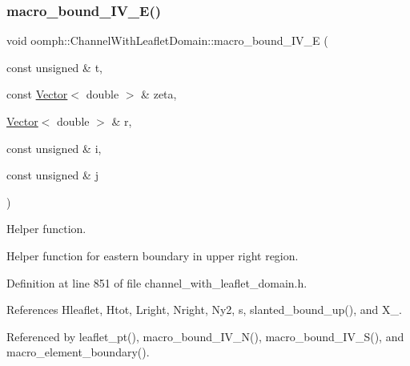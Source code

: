 \subsubsection{\texorpdfstring{macro\+\_\+bound\+\_\+\+I\+V\+\_\+\+E()}{macro\_bound\_IV\_E()}}
{\footnotesize\ttfamily void oomph\+::\+Channel\+With\+Leaflet\+Domain\+::macro\+\_\+bound\+\_\+\+I\+V\+\_\+E (\begin{DoxyParamCaption}\item[{const unsigned \&}]{t,  }\item[{const \hyperlink{classoomph_1_1Vector}{Vector}$<$ double $>$ \&}]{zeta,  }\item[{\hyperlink{classoomph_1_1Vector}{Vector}$<$ double $>$ \&}]{r,  }\item[{const unsigned \&}]{i,  }\item[{const unsigned \&}]{j }\end{DoxyParamCaption})\hspace{0.3cm}{\ttfamily [protected]}}



Helper function. 

Helper function for eastern boundary in upper right region. 

Definition at line 851 of file channel\+\_\+with\+\_\+leaflet\+\_\+domain.\+h.



References Hleaflet, Htot, Lright, Nright, Ny2, s, slanted\+\_\+bound\+\_\+up(), and X\+\_.



Referenced by leaflet\+\_\+pt(), macro\+\_\+bound\+\_\+\+I\+V\+\_\+\+N(), macro\+\_\+bound\+\_\+\+I\+V\+\_\+\+S(), and macro\+\_\+element\+\_\+boundary().

\mbox{\label{classoomph_1_1ChannelWithLeafletDomain_ae8d9410d270e27677cb89c5dfe9cc136}} 
